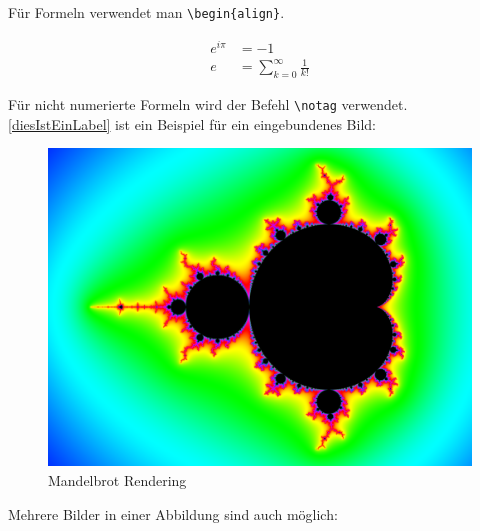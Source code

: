 Für Formeln verwendet man \lstinline|\begin{align}|.
	
\begin{align}
	e^{i \pi} &= -1 \\
	e &= \sum_{k=0}^{\infty}\frac{1}{k!}
\end{align}

Für nicht numerierte Formeln wird der Befehl \lstinline|\notag| verwendet.
\\
\autoref{diesIstEinLabel} ist ein Beispiel für ein eingebundenes Bild:

\begin{figure}[H] %
	\centering
	\includegraphics[width=.8\linewidth]{Bilder/mandelbrot}
	\caption{Mandelbrot Rendering}
	\label{diesIstEinLabel} %
\end{figure}



Mehrere Bilder in einer Abbildung sind auch möglich:

